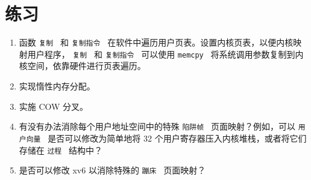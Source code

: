 \documentclass[UTF8]{article}
\begin{document}
   \section{练习  }     

   \begin{enumerate}


   \item   函数  {    \tt    复制   }  和  {    \tt    复制指令   }  在软件中遍历用户页表。设置内核页表，以便内核映射用户程序， {    \tt    复制   }  和  {    \tt    复制指令   }  可以使用  {    \tt    memcpy   }  将系统调用参数复制到内核空间，依靠硬件进行页表遍历。   \item   实现惰性内存分配。   \item   实施 COW 分叉。   \item   有没有办法消除每个用户地址空间中的特殊  {    \tt    陷阱帧   }  页面映射？例如，可以
  {    \tt    用户向量   }  是否可以修改为简单地将 32 个用户寄存器压入内核堆栈，或者将它们存储在  {    \tt    过程   }  结构中？   \item   是否可以修改 xv6 以消除特殊的  {    \tt    蹦床   }  页面映射？  \end{enumerate}     
\end{document}
